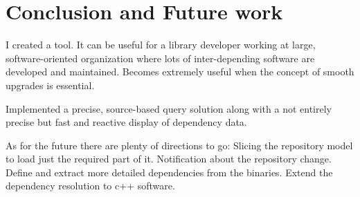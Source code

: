 \chapter{Conclusion and Future work}

I created a tool.
It can be useful for a library developer working at large, software-oriented
organization where lots of inter-depending software are developed and
maintained.
Becomes extremely useful when the concept of smooth upgrades is essential.

Implemented a precise, source-based  query solution along with a not entirely
precise but fast and reactive display of dependency data.

As for the future there are plenty of directions to go:
Slicing the repository model to load just the required part of it.
Notification about the repository change.
Define and extract more detailed dependencies from the binaries.
Extend the dependency resolution to c++ software.
